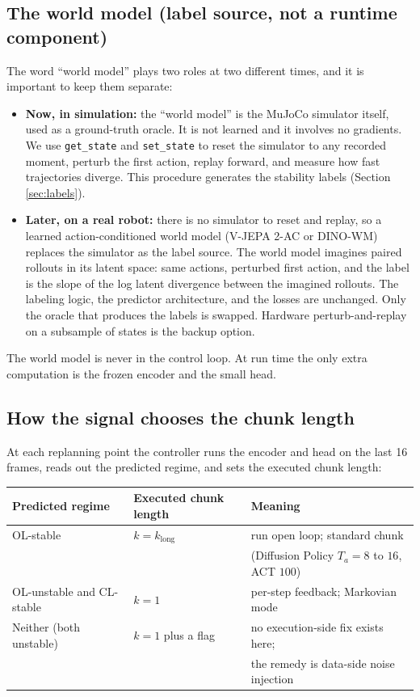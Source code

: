 \documentclass[11pt]{article}
\begin{document}
\subsection{The world model (label source, not a runtime component)}

The word ``world model'' plays two roles at two different times, and it is important to
keep them separate:

\begin{itemize}[leftmargin=2em]
  \item \textbf{Now, in simulation:} the ``world model'' is the MuJoCo simulator itself,
        used as a ground-truth oracle. It is not learned and it involves no gradients.
        We use \texttt{get\_state} and \texttt{set\_state} to reset the simulator to any
        recorded moment, perturb the first action, replay forward, and measure how fast
        trajectories diverge. This procedure generates the stability labels
        (Section \ref{sec:labels}).
  \item \textbf{Later, on a real robot:} there is no simulator to reset and replay, so a
        learned action-conditioned world model (V-JEPA 2-AC or DINO-WM) replaces the
        simulator as the label source. The world model imagines paired rollouts in its
        latent space: same actions, perturbed first action, and the label is the slope
        of the log latent divergence between the imagined rollouts. The labeling logic,
        the predictor architecture, and the losses are unchanged. Only the oracle that
        produces the labels is swapped. Hardware perturb-and-replay on a subsample of
        states is the backup option.
\end{itemize}

The world model is never in the control loop. At run time the only extra computation is
the frozen encoder and the small head.

\subsection{How the signal chooses the chunk length}
\label{sec:controller}

At each replanning point the controller runs the encoder and head on the last 16 frames,
reads out the predicted regime, and sets the executed chunk length:

\begin{center}
\begin{tabular}{@{}lll@{}}
\toprule
Predicted regime & Executed chunk length & Meaning \\
\midrule
OL-stable & $k = k_{\mathrm{long}}$ & run open loop; standard chunk \\
 & & (Diffusion Policy $T_a = 8$ to $16$, ACT $100$) \\
OL-unstable and CL-stable & $k = 1$ & per-step feedback; Markovian mode \\
Neither (both unstable) & $k = 1$ plus a flag & no execution-side fix exists here; \\
 & & the remedy is data-side noise injection \\
\bottomrule
\end{tabular}
\end{center}
\end{document}
